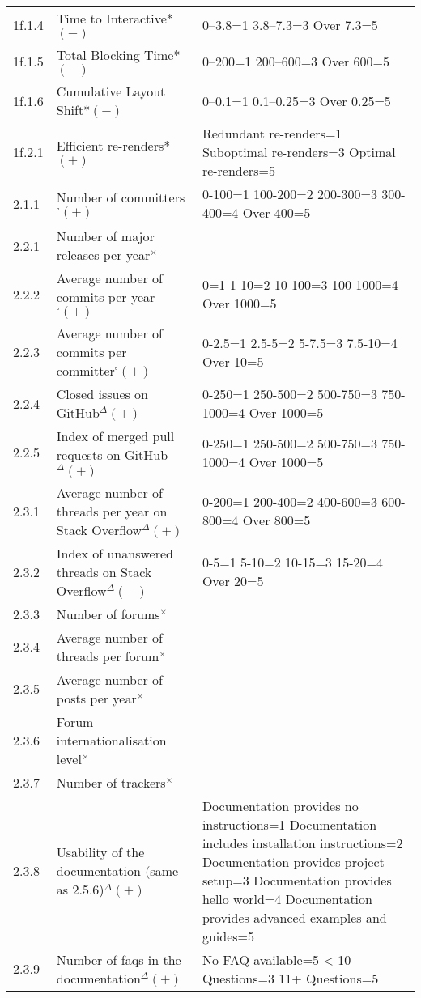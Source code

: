 \begin{longtable}[]{|p{1cm}p{6cm}p{6cm}|}
1f.1.4 & Time to Interactive*$(-)$ & 0--3.8=1 3.8--7.3=3 Over 7.3=5 \\
1f.1.5 & Total Blocking Time*$(-)$ & 0--200=1 200--600=3 Over 600=5 \\
1f.1.6 & Cumulative Layout Shift*$(-)$ & 0--0.1=1 0.1--0.25=3 Over 0.25=5 \\
1f.2.1 & Efficient re-renders*$(+)$ & Redundant re-renders=1 Suboptimal
re-renders=3 Optimal re-renders=5 \\
2.1.1 & Number of committers$^{\square}(+)$ & 0-100=1 100-200=2 200-300=3 300-400=4
Over 400=5 \\
2.2.1 & Number of major releases per year$^{\times}$ & \\
2.2.2 & Average number of commits per year$^{\square}(+)$ & 0=1 1-10=2 10-100=3
100-1000=4 Over 1000=5 \\
2.2.3 & Average number of commits per committer$^{\square}(+)$ & 0-2.5=1 2.5-5=2
5-7.5=3 7.5-10=4 Over 10=5 \\
2.2.4 & Closed issues on GitHub$^{\Delta}(+)$ & 0-250=1 250-500=2 500-750=3
750-1000=4 Over 1000=5 \\
2.2.5 & Index of merged pull requests on GitHub$^{\Delta}(+)$ &
0-250=1 250-500=2 500-750=3 750-1000=4 Over 1000=5 \\
2.3.1 & Average number of threads per year on Stack Overflow$^{\Delta}(+)$ & 0-200=1
200-400=2 400-600=3 600-800=4 Over 800=5 \\
2.3.2 & Index of unanswered threads on Stack Overflow$^{\Delta}(-)$ & 0-5=1 5-10=2
10-15=3 15-20=4 Over 20=5 \\
2.3.3 & Number of forums$^{\times}$ & \\
2.3.4 & Average number of threads per forum$^{\times}$ & \\
2.3.5 & Average number of posts per year$^{\times}$ & \\
2.3.6 & Forum internationalisation level$^{\times}$ & \\
2.3.7 & Number of trackers$^{\times}$ & \\
2.3.8 & Usability of the documentation (same as 2.5.6)$^{\Delta}(+)$ &
Documentation provides no instructions=1 Documentation includes
installation instructions=2 Documentation provides project setup=3
Documentation provides hello world=4 Documentation provides advanced
examples and guides=5 \\
2.3.9 & Number of faqs in the documentation$^{\Delta}(+)$ & No FAQ available=5
\textless{} 10 Questions=3 11+ Questions=5 \\

\end{longtable}
